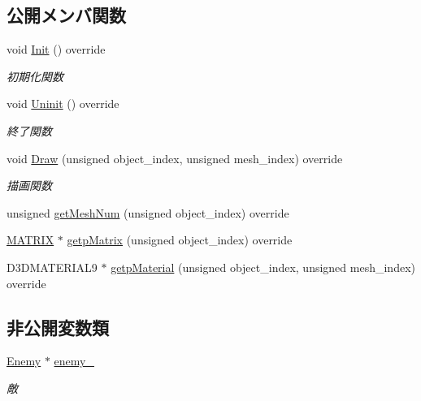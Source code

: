 \subsection*{公開メンバ関数}
\begin{DoxyCompactItemize}
\item 
void \mbox{\hyperlink{class_enemy_draw_aa1659c35fa757db6a6cf07e26ad9ddfb}{Init}} () override
\begin{DoxyCompactList}\small\item\em 初期化関数 \end{DoxyCompactList}\item 
void \mbox{\hyperlink{class_enemy_draw_a2861dc0623b0be7726bc69a6a469190e}{Uninit}} () override
\begin{DoxyCompactList}\small\item\em 終了関数 \end{DoxyCompactList}\item 
void \mbox{\hyperlink{class_enemy_draw_a20a23c1c5fd5e510d15e8ca27aabd821}{Draw}} (unsigned object\+\_\+index, unsigned mesh\+\_\+index) override
\begin{DoxyCompactList}\small\item\em 描画関数 \end{DoxyCompactList}\item 
unsigned \mbox{\hyperlink{class_enemy_draw_a1d8a943e4b625795bbd5ae614cc38ed1}{get\+Mesh\+Num}} (unsigned object\+\_\+index) override
\item 
\mbox{\hyperlink{_vector3_d_8h_a032295cd9fb1b711757c90667278e744}{M\+A\+T\+R\+IX}} $\ast$ \mbox{\hyperlink{class_enemy_draw_afbb8ac19041abda280ece7737103dc66}{getp\+Matrix}} (unsigned object\+\_\+index) override
\item 
D3\+D\+M\+A\+T\+E\+R\+I\+A\+L9 $\ast$ \mbox{\hyperlink{class_enemy_draw_a3f2885da84533364daaaac4a801fbc46}{getp\+Material}} (unsigned object\+\_\+index, unsigned mesh\+\_\+index) override
\end{DoxyCompactItemize}
\subsection*{非公開変数類}
\begin{DoxyCompactItemize}
\item 
\mbox{\hyperlink{class_enemy}{Enemy}} $\ast$ \mbox{\hyperlink{class_enemy_draw_a95b8a7f07e810d1347f1704669c8f790}{enemy\+\_\+}}
\begin{DoxyCompactList}\small\item\em 敵 \end{DoxyCompactList}\end{DoxyCompactItemize}


